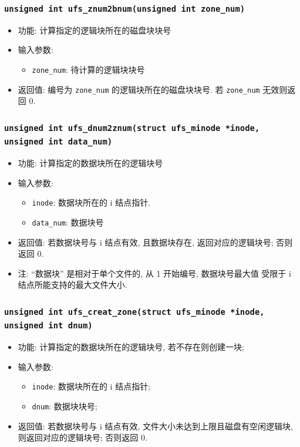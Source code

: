 \documentclass[nofonts, titlepage]{ctexart}
\begin{document}
  \subsubsection[\texttt{ufs\_znum2bnum}]{\texttt{unsigned int ufs\_znum2bnum(unsigned int zone\_num)}}
  \begin{itemize}
\item
  功能: 计算指定的逻辑块所在的磁盘块块号
\item
  输入参数:

  \begin{itemize}
  \item
    \texttt{zone\_num}: 待计算的逻辑块块号
  \end{itemize}
\item
  返回值: 编号为 \texttt{zone\_num} 的逻辑块所在的磁盘块块号. 若
  \texttt{zone\_num} 无效则返回 0.
  \end{itemize}
  \subsubsection[\texttt{ufs\_dnum2znum}]{\texttt{unsigned int ufs\_dnum2znum(struct ufs\_minode *inode, unsigned int data\_num)}}
\begin{itemize}
\item
  功能: 计算指定的数据块所在的逻辑块号
\item
  输入参数:

  \begin{itemize}
  \item
    \texttt{inode}: 数据块所在的 i 结点指针.
  \item
    \texttt{data\_num}: 数据块号
  \end{itemize}
\item
  返回值: 若数据块号与 i 结点有效, 且数据块存在, 返回对应的逻辑块号;
  否则返回 0.
\item
  注: ``数据块'' 是相对于单个文件的, 从 1 开始编号, 数据块号最大值
  受限于 i 结点所能支持的最大文件大小.
  \end{itemize}
  \subsubsection[\texttt{ufs\_creat\_zone}]{\texttt{unsigned int ufs\_creat\_zone(struct ufs\_minode *inode, unsigned int dnum)}}
  \begin{itemize}
\item
  功能: 计算指定的数据块所在的逻辑块号, 若不存在则创建一块;
\item
  输入参数:

  \begin{itemize}
  \item
    \texttt{inode}: 数据块所在的 i 结点指针;
  \item
    \texttt{dnum}: 数据块块号;
  \end{itemize}
\item
  返回值: 若数据块号与 i 结点有效, 文件大小未达到上限且磁盘有空闲逻辑块,
  则返回对应的逻辑块号; 否则返回 0.
  \end{itemize}
\end{document}
